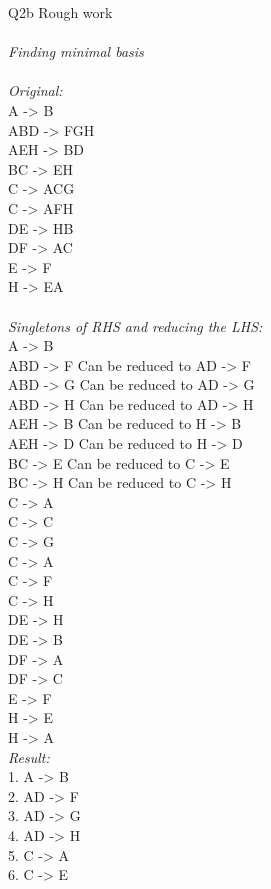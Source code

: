 \documentclass[12pt]{article}
\begin{document}
\newpage
Q2b Rough work \\
\\
\textit{Finding minimal basis}\\
\\
\textit{Original:}\\
A -> B \\
ABD -> FGH\\
AEH -> BD\\
BC ->  EH\\
C ->  ACG\\
C ->  AFH\\
DE ->  HB\\
DF ->  AC\\
E ->  F\\
H ->  EA\\
\\
\textit{Singletons of RHS and reducing the LHS:} \\
A -> B \\
ABD -> F \hskip 25pt Can be reduced to AD ->  F\\
ABD -> G \hskip 25pt Can be reduced to AD ->  G\\
ABD -> H \hskip 25pt Can be reduced to AD ->  H\\ 
AEH -> B \hskip 25pt Can be reduced to H ->  B\\
AEH -> D \hskip 25pt Can be reduced to H ->  D\\
BC ->  E \hskip 25pt Can be reduced to C ->  E\\
BC ->  H \hskip 25pt Can be reduced to C ->  H\\
C ->  A\\
C ->  C\\
C ->  G\\
C ->  A\\
C ->  F\\
C ->  H\\
DE ->  H\\
DE ->  B\\
DF ->  A\\
DF ->  C\\
E ->  F\\
H ->  E\\
H ->  A\\
\textit{Result:}\\
1. A -> B \\
2. AD ->  F\\
3. AD ->  G\\
4. AD ->  H\\ 
5. C ->  A\\
6. C ->  E\\ 
\end{document}
